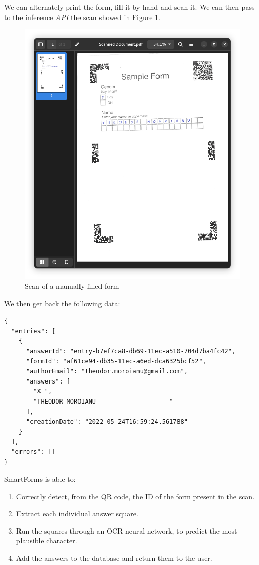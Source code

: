 \documentclass[11pt, a4paper]{report}
\begin{document}
We can alternately print the form, fill it by hand and scan it. We can then pass to the inference \textit{API} the scan showed in Figure \ref{scan-of-filled-form}.

\begin{figure}[!h]
    \centering
    \includegraphics[width=30em]{images/screenshoots/sample_form_scan.png}
    \caption{Scan of a manually filled form}
    \label{scan-of-filled-form}
\end{figure}


We then get back the following data:

\begin{verbatim}
{
  "entries": [
    {
      "answerId": "entry-b7ef7ca8-db69-11ec-a510-704d7ba4fc42",
      "formId": "af61ce94-db35-11ec-a6ed-dca6325bcf52",
      "authorEmail": "theodor.moroianu@gmail.com",
      "answers": [
        "X ",
        "THEODOR MOROIANU                    "
      ],
      "creationDate": "2022-05-24T16:59:24.561788"
    }
  ],
  "errors": []
}
\end{verbatim}

SmartForms is able to:
\begin{enumerate}
    \item Correctly detect, from the QR code, the ID of the form present in the scan.
    \item Extract each individual answer square.
    \item Run the squares through an OCR neural network, to predict the most plausible character.
    \item Add the answers to the database and return them to the user.
\end{enumerate}
\end{document}
